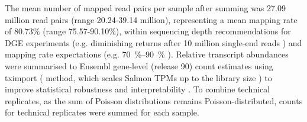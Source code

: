 %
%
The mean number of mapped read pairs per sample after summing was 27.09 million read pairs (range 20.24-39.14 million), representing a mean mapping rate of 80.73\% (range 75.57-90.10\%), within sequencing depth recommendations for \gls{DGE} experiments (e.g. diminishing returns after 10 million single-end reads \autocite{liu2014RNAseqDifferentialExpression}) and mapping rate expectations (e.g. \SIrange{70}{90}{\percent} \autocite{conesa2016SurveyBestPractices}).
%
Relative transcript abundances were summarised to Ensembl gene-level (release 90) count estimates using tximport ( method, which scales Salmon \glspl{TPM} up to the library size \autocite{soneson2016DifferentialAnalysesRNAseq,love2018SwimmingDownstreamStatistical}) to improve statistical robustness and interpretability \autocite{soneson2016DifferentialAnalysesRNAseq}.
To combine technical replicates, as the sum of Poisson distributions remains Poisson-distributed, counts for technical replicates were summed for each sample.

